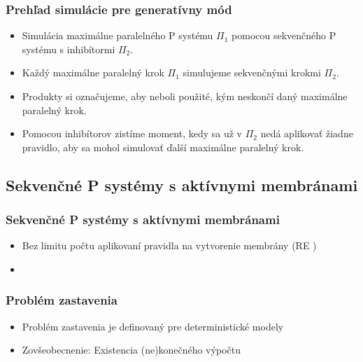 \begin{frame}[t]\frametitle{Prehľad simulácie pre generatívny mód}
  \begin{itemize}
    \item Simulácia maximálne paralelného P systému $\Pi_1$ pomocou sekvenčného P systému s inhibítormi $\Pi_2$.
    \pause
    \item Každý maximálne paralelný krok $\Pi_1$ simulujeme sekvenčnými krokmi $\Pi_2$.
    \pause
    \item Produkty si označujeme, aby neboli použité, kým neskončí daný maximálne paralelný krok.
    \pause
    \item Pomocou inhibítorov zistíme moment, kedy sa už v $\Pi_2$ nedá aplikovať žiadne pravidlo, aby sa mohol simulovať ďalší maximálne paralelný krok.
  \end{itemize}
\end{frame}
\note{}


\subsection{Sekvenčné P systémy s aktívnymi membránami} %
\label{sub:sekven_n_p_syst_my_s_akt_vnymi_membr_nami}

\begin{frame}[t]\frametitle{Sekvenčné P systémy s aktívnymi membránami}
  \begin{itemize}
    \item Bez limitu počtu aplikovaní pravidla na vytvorenie membrány (RE \cite{Ibarra05Active})
    \pause
    \item {}
  \end{itemize}

  
\end{frame}

\begin{frame}[t]\frametitle{Problém zastavenia}
  \begin{itemize}
    \item Problém zastavenia je definovaný pre deterministické modely
    \pause
    \item Zovšeobecnenie: Existencia (ne)konečného výpočtu
  \end{itemize}

\end{frame}
\note{}

